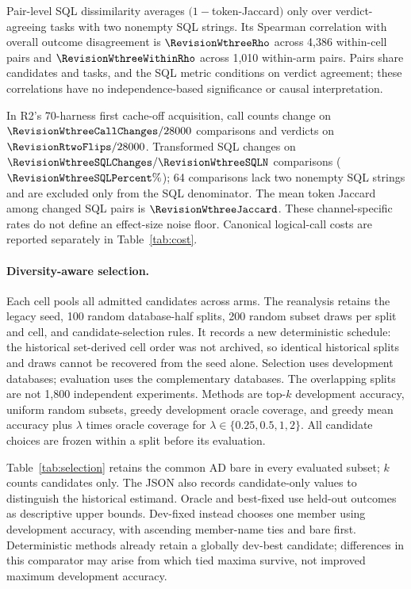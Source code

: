 Pair-level SQL dissimilarity averages $(1-$token-Jaccard$)$ only over
verdict-agreeing tasks with two nonempty SQL strings. Its Spearman
correlation with overall outcome disagreement is $\RevisionWthreeRho$
across 4{,}386 within-cell pairs and $\RevisionWthreeWithinRho$ across
1{,}010 within-arm pairs. Pairs share candidates and tasks, and the SQL
metric conditions on verdict agreement; these correlations have no
independence-based significance or causal interpretation.

In R2's 70-harness first cache-off acquisition, call counts change on
$\RevisionWthreeCallChanges/28000$ comparisons and verdicts on
$\RevisionRtwoFlips/28000$. Transformed SQL changes on
$\RevisionWthreeSQLChanges/\RevisionWthreeSQLN$ comparisons
($\RevisionWthreeSQLPercent\%$); 64 comparisons lack two nonempty SQL
strings and are excluded only from the SQL denominator. The mean token
Jaccard among changed SQL pairs is $\RevisionWthreeJaccard$. These
channel-specific rates do not define an effect-size noise floor.
Canonical logical-call costs are reported separately in Table~\ref{tab:cost}.

\paragraph{Diversity-aware selection.} Each cell pools all admitted
candidates across arms. The reanalysis retains the legacy seed, 100
random database-half splits, 200 random subset draws per split and cell,
and candidate-selection rules. It records a new deterministic schedule:
the historical set-derived cell order was not archived, so identical
historical splits and draws cannot be recovered from the seed alone.
Selection uses development databases; evaluation uses the complementary
databases. The overlapping splits are not 1{,}800 independent experiments.
Methods are top-$k$ development accuracy, uniform random subsets, greedy
development oracle coverage, and greedy mean accuracy plus
$\lambda$ times oracle coverage for $\lambda\in\{0.25,0.5,1,2\}$.
All candidate choices are frozen within a split before its evaluation.

Table~\ref{tab:selection} retains the common AD bare in every evaluated
subset; $k$ counts candidates only. The JSON also records candidate-only
values to distinguish the historical estimand. Oracle and best-fixed use
held-out outcomes as descriptive upper bounds. Dev-fixed instead chooses
one member using development accuracy, with ascending member-name ties
and bare first. Deterministic methods already retain a globally dev-best
candidate; differences in this comparator may arise from which tied
maxima survive, not improved maximum development accuracy.

